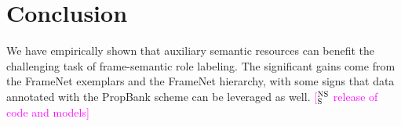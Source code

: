 \documentclass[11pt,a4paper]{article}
\newcommand{\ensuretext}[1]{#1}
\newcommand{\nssmarker}{\ensuretext{\textcolor{magenta}{\ensuremath{^{\textsc{NS}}_{\textsc{S}}}}}}
\newcommand{\mkmarker}{\ensuretext{\textcolor{red}{\ensuremath{^{\textsc{M}}_{\textsc{K}}}}}}
\newcommand{\arkcomment}[3]{\ensuretext{\textcolor{#3}{[#1 #2]}}}
\newcommand{\nss}[1]{\arkcomment{\nssmarker}{#1}{magenta}}
\newcommand{\mk}[1]{\arkcomment{\mkmarker}{#1}{red}}
\newcommand{\finalversion}[1]{}
\begin{document}



\section{Conclusion}

We have empirically shown that auxiliary semantic resources
can benefit the challenging task of frame-semantic role labeling. 
The significant gains come from the FrameNet exemplars and the FrameNet hierarchy, with
some signs that data annotated with the PropBank scheme can be leveraged as well.
\nss{release of code and models}


\finalversion{We are optimistic that future improvements to lexical semantic resources, 
including planned changes for PropBank \citep{bonial-14} and SemLink \citep{bonial-13}, 
will lead to further gains in this task. 
Moreover, the techniques discussed here could be further explored 
using semi-automatic mappings between lexical resources \citep[such as UBY;][]{gurevych-12}, 
and correspondingly, this task could be used to extrinsically validate those mappings.}
\finalversion{\nss{release of code and models}}

\finalversion{\section*{Acknowledgments}

FUNDING}

\smaller


\setlength{\bibsep}{1pt}
{\fontsize{10}{12.25}\selectfont
}
\end{document}
